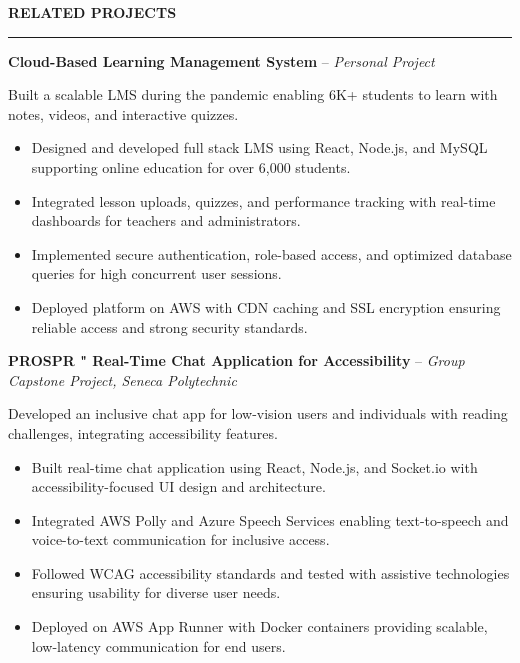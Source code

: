 \documentclass[10pt,letterpaper]{article}
\begin{document}
\vspace{6pt}

\textbf{RELATED PROJECTS}\\[-8pt]
\noindent\rule{\textwidth}{1pt}

\vspace{-2pt}

\textbf{Cloud-Based Learning Management System} -- \emph{Personal Project}

\vspace{-1pt}

Built a scalable LMS during the pandemic enabling 6K+ students to learn with notes, videos, and interactive quizzes.
\vspace{-1pt}
\begin{itemize}
\item Designed and developed full stack LMS using React, Node.js, and MySQL supporting online education for over 6,000 students.
\item Integrated lesson uploads, quizzes, and performance tracking with real-time dashboards for teachers and administrators.
\item Implemented secure authentication, role-based access, and optimized database queries for high concurrent user sessions.
\item Deployed platform on AWS with CDN caching and SSL encryption ensuring reliable access and strong security standards.
\end{itemize}

\textbf{PROSPR " Real-Time Chat Application for Accessibility} -- \emph{Group Capstone Project, Seneca Polytechnic}

\vspace{-1pt}

Developed an inclusive chat app for low-vision users and individuals with reading challenges, integrating accessibility features.
\vspace{-1pt}
\begin{itemize}
\item Built real-time chat application using React, Node.js, and Socket.io with accessibility-focused UI design and architecture.
\item Integrated AWS Polly and Azure Speech Services enabling text-to-speech and voice-to-text communication for inclusive access.
\item Followed WCAG accessibility standards and tested with assistive technologies ensuring usability for diverse user needs.
\item Deployed on AWS App Runner with Docker containers providing scalable, low-latency communication for end users.
\end{itemize}
\end{document}
